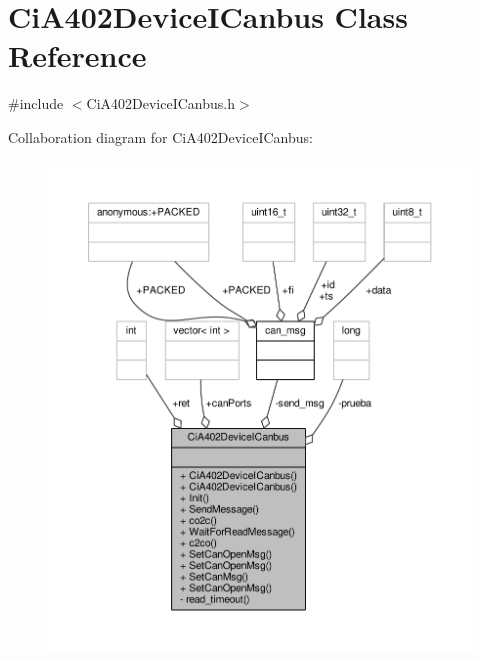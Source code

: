 \hypertarget{classCiA402DeviceICanbus}{}\section{Ci\+A402\+Device\+I\+Canbus Class Reference}
\label{classCiA402DeviceICanbus}


{\ttfamily \#include $<$Ci\+A402\+Device\+I\+Canbus.\+h$>$}



Collaboration diagram for Ci\+A402\+Device\+I\+Canbus\+:\nopagebreak
\begin{figure}[H]
\begin{center}
\leavevmode
\includegraphics[width=350pt]{classCiA402DeviceICanbus__coll__graph}
\end{center}
\end{figure}
